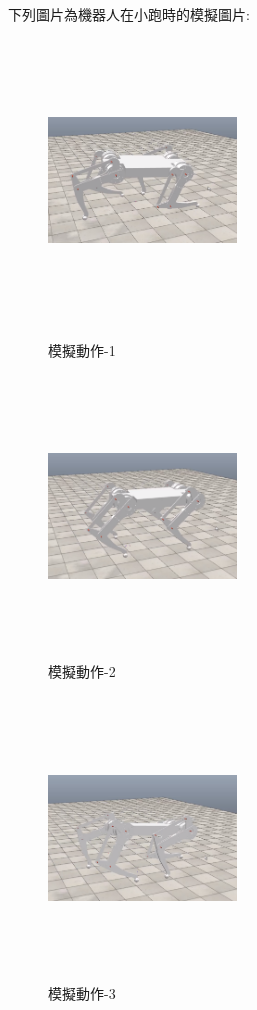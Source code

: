 下列圖片為機器人在小跑時的模擬圖片:\
\begin{figure}[htbp]
  \begin{minipage}[t]{0.5\linewidth}
    \centering
    \includegraphics[height=7.5cm,width=5cm]{模擬動作-1}
    \caption{模擬動作-1}
    \label{模擬動作-1}
  \end{minipage}
  \hfill
  \begin{minipage}[t]{0.5\linewidth}
    \centering
    \includegraphics[height=7.5cm,width=5cm]{模擬動作-2}
    \caption{模擬動作-2}
    \label{模擬動作-2}
  \end{minipage}
\end{figure}

\begin{figure}[hbt!]
\begin{center}
\includegraphics[height=7.5cm,width=5cm]{模擬動作-3}
\caption{\Large 模擬動作-3}\label{模擬動作-3}
\end{center}
\end{figure}
\newpage
